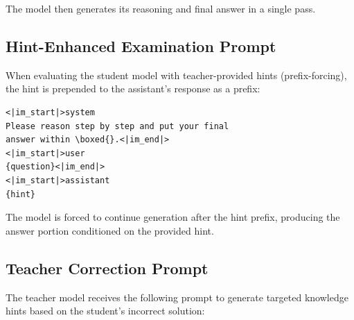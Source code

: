 \noindent The model then generates its reasoning and final answer in a single pass.

\subsection{Hint-Enhanced Examination Prompt}\label{app:hint-exam-prompt}

When evaluating the student model with teacher-provided hints (prefix-forcing), the hint is prepended to the assistant's response as a prefix:

\begin{tcolorbox}[colback=blue!3, colframe=blue!40, title=Hint-Enhanced Exam Input Format]
\begin{verbatim}
<|im_start|>system
Please reason step by step and put your final 
answer within \boxed{}.<|im_end|>
<|im_start|>user
{question}<|im_end|>
<|im_start|>assistant
{hint}
\end{verbatim}
\end{tcolorbox}

\noindent The model is forced to continue generation after the hint prefix, producing the answer portion conditioned on the provided hint.

\subsection{Teacher Correction Prompt}\label{app:teacher-correct-prompt}

The teacher model receives the following prompt to generate targeted knowledge hints based on the student's incorrect solution:


